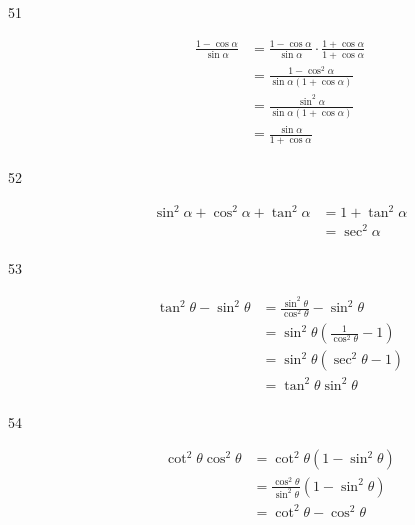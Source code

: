 \documentclass{exam}
\begin{document}
\begin{description}
      \item[51] 
        \begin{align*}
          \frac{1 - \cos \alpha}{\sin \alpha} & = \frac{1 - \cos \alpha}{\sin \alpha} \cdot \frac{1 + \cos \alpha}{1 + \cos \alpha} \\
                                              & = \frac{1 - \cos^2 \alpha}{\sin \alpha ( 1 + \cos \alpha ) } \\
                                              & = \frac{\sin^2 \alpha}{\sin \alpha ( 1 + \cos \alpha ) } \\
                                              & = \frac{\sin \alpha}{1 + \cos \alpha } \\
        \end{align*}

      \item[52] 
        \begin{align*}
          \sin^2 \alpha + \cos^2 \alpha + \tan^2 \alpha & = 1 + \tan^2 \alpha \\
                                                        & = \sec^2 \alpha \\
        \end{align*}

      \item[53] 
        \begin{align*}
          \tan^2 \theta - \sin^2 \theta & = \frac{\sin^2 \theta}{\cos^2 \theta} - \sin^2 \theta \\
                                        & = \sin^2 \theta \left( \frac{1}{\cos^2 \theta} - 1 \right) \\
                                        & = \sin^2 \theta \left( \sec^2 \theta - 1 \right) \\
                                        & = \tan^2 \theta \sin^2 \theta \\
        \end{align*}

      \item[54] 
        \begin{align*}
          \cot^2 \theta \cos^2 \theta & = \cot^2 \theta \left( 1 - \sin^2 \theta \right) \\
                                      & = \frac{\cos^2 \theta}{\sin^2 \theta} \left( 1 - \sin^2 \theta \right) \\
                                      & = \cot^2 \theta - \cos^2 \theta \\
        \end{align*}


\end{description}
\end{document}
